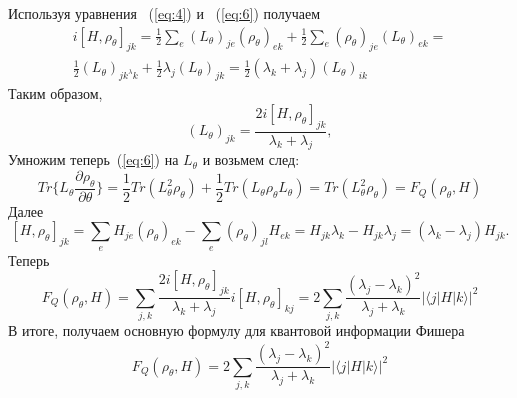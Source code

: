Используя уравнения ~(\ref{eq:4}) и ~(\ref{eq:6}) получаем
%
\begin{multline}\label{eq:7}
    i \left[H,\rho_\theta \right]_{jk} =
        \frac{1}{2} \sum_e \left(L_\theta \right)_{je}
            \left(\rho_\theta \right)_{ek} +
                \frac{1}{2} \sum_e \left(\rho_\theta \right)_{je}
                    \left(L_\theta \right)_{ek} =\\
                \frac{1}{2}\left(L_\theta \right)_{{jk}^{\lambda} k} +
            \frac{1}{2}\lambda_j \left(L_\theta \right)_{jk} =
    \frac{1}{2} \left(\lambda_k + \lambda_j \right)
    \left(L_\theta \right)_{ik}
\end{multline}
%
Таким образом,
\begin{equation}
    \label{eq:8}
        \left(L_\theta \right)_{jk} =
            \frac{2i\left[H,\rho_\theta \right]_{jk}}{\lambda_k + \lambda_j},
\end{equation}
%
Умножим теперь~(\ref{eq:6}) на $L_\theta$ и возьмем след:
%
\begin{equation}
    \label{eq:9}
        Tr\Bigg\{L_\theta \frac{\partial \rho_\theta}{\partial \theta} \Bigg\} =
            \frac{1}{2} Tr\left(L^2_\theta \rho_\theta \right) +
                \frac{1}{2} Tr\left(L_\theta \rho_\theta L_\theta \right) =
            Tr \left(L^2_\theta \rho_\theta \right) =
        F_Q \left(\rho_\theta, H \right)
\end{equation}
%
Далее
%
\begin{equation}
    \label{eq:10}
        \left[H, \rho_\theta \right]_{jk} = \sum_e H_{je}
            \left(\rho_\theta \right)_{ek} -
                \sum_e \left(\rho_\theta \right)_{jl}H_{ek} =
            H_{jk}\lambda_k - H_{jk}\lambda_j =
        \left(\lambda_k - \lambda_j \right) H_{jk}.
\end{equation}
%
Теперь
%
\begin{equation}
    \label{eq:11}
        F_Q \left(\rho_\theta, H \right) =
            \sum_{j,k}\frac{2i\left[H,\rho_\theta \right]_{jk}}
                {\lambda_k + \lambda_j}
                    i \left[H, \rho_\theta \right]_{kj} =
                2\sum_{j,k} \frac{\left(\lambda_j - \lambda_k \right)^2}
            {\lambda_j + \lambda_k}
        \left| \langle j|H|k \rangle \right|^2
\end{equation}
%
В итоге, получаем основную формулу для квантовой информации Фишера
%
\begin{equation}\label{eq:quantum-fisher-information}
        F_Q \left(\rho_\theta, H \right) =
            2\sum_{j,k} \frac{\left(\lambda_j - \lambda_k \right)^2}
                {\lambda_j + \lambda_k}
            \left| \langle j|H|k \rangle \right|^2
\end{equation}

